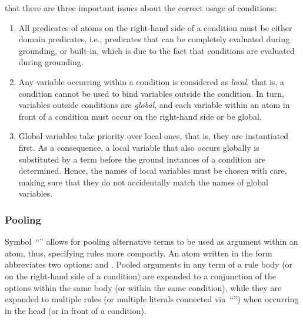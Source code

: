 \begin{Note}
that there are three important issues about the correct usage of conditions:
\begin{enumerate}
\item All predicates of atoms on the right-hand side of a condition
must be either domain predicates,%
i.e., predicates that can be completely evaluated during grounding,
or built-in, which is due to the fact that conditions are evaluated during grounding.
\item Any variable occurring within a condition is considered as \emph{local},
that is, a condition cannot be used to bind variables outside the condition.
In turn, variables outside conditions are \emph{global}, and each variable
within an atom in front of a condition must occur on the right-hand side or
be global.
\item Global variables take priority over local ones, that is,
they are instantiated first.
As a consequence, a local variable that also occurs globally is substituted by a term
before the ground instances of a condition are determined.
Hence, the names of local variables must be chosen with care,
making sure that they do not accidentally match the names of global variables.
\end{enumerate}
\end{Note}

\subsubsection{Pooling}\label{subsec:gringo:pool}

Symbol~``\code{;}'' allows for pooling alternative terms to be used as
argument within an atom, thus, specifying rules more compactly.
An atom written in the form 
abbreviates two options:
 and .
Pooled arguments in any term of a rule body 
(or on the right-hand side of a condition) are expanded to a conjunction
of the options within the same body (or within the same condition),
while they are expanded to multiple rules 
(or multiple literals connected via~``\code{,}'')
when occurring in the head (or in front of a condition).

